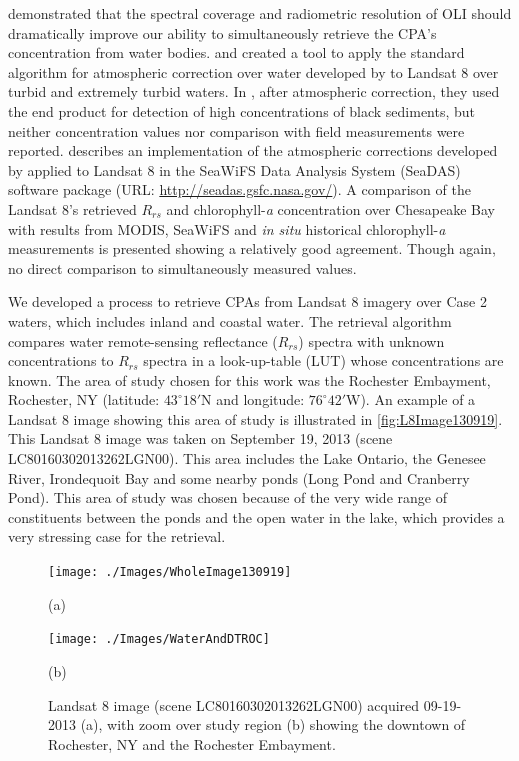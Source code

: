 \documentclass[onecolumn,3p,letterpaper]{elsarticle}
\begin{document}
\cite*{Gerace:2013} demonstrated that the spectral coverage and radiometric resolution of OLI should dramatically improve our ability to simultaneously retrieve the CPA's concentration from water bodies. \cite{Vanhellemont2014} and \cite{Vanhellemont:2015} created a tool to apply the standard algorithm for atmospheric correction over water developed by \cite{Gordon:1994} to Landsat 8 over turbid and extremely turbid waters. In \cite{Vanhellemont:2015}, after atmospheric correction, they used the end product for detection of high concentrations of black sediments, but neither concentration values nor comparison with field measurements were reported. \cite{Franz:2015} describes an implementation of the atmospheric corrections developed by \cite{Gordon:1994} applied to Landsat 8 in the SeaWiFS Data Analysis System (SeaDAS) software package (URL: \url{http://seadas.gsfc.nasa.gov/}). A comparison of the Landsat 8's retrieved $R_{rs}$ and chlorophyll-{\it a} concentration over Chesapeake Bay with results from MODIS, SeaWiFS and {\it in situ} historical chlorophyll-{\it a} measurements is presented showing a relatively good agreement. Though again, no direct comparison to simultaneously measured values.


We developed a process to retrieve CPAs from Landsat 8 imagery over Case 2 waters, which includes inland and coastal water. The retrieval algorithm compares water remote-sensing reflectance ($R_{rs}$) spectra with unknown concentrations to $R_{rs}$ spectra in a look-up-table (LUT) whose concentrations are known. The area of study chosen for this work was the Rochester Embayment, Rochester, NY (latitude: $43^\circ18'$N and longitude: $76^\circ42'$W). An example of a Landsat 8 image showing this area of study is illustrated in \autoref{fig:L8Image130919}. This Landsat 8 image was taken on September 19, 2013 (scene LC80160302013262LGN00). This area includes the Lake Ontario, the Genesee River, Irondequoit Bay and some nearby ponds (Long Pond and Cranberry Pond). This area of study was chosen because of the very wide range of constituents between the ponds and the open water in the lake, which provides a very stressing case for the retrieval.


\begin{figure}[htbp!]
  	\begin{minipage}[c]{0.48\linewidth}
    	\centering
    	\texttt{[image: ./Images/WholeImage130919]}
    	\centerline{(a)}\medskip
  	\end{minipage}
  	\hfill
  	\begin{minipage}[d]{0.48\linewidth}
    	\centering
    	\texttt{[image: ./Images/WaterAndDTROC]}
    	\centerline{(b)}\medskip
    \end{minipage}	

    \caption{Landsat 8 image (scene LC80160302013262LGN00) acquired 09-19-2013 (a), with zoom over study region (b) showing the downtown of Rochester, NY and the Rochester Embayment. \label{fig:L8Image130919} }
\end{figure}
\end{document}
